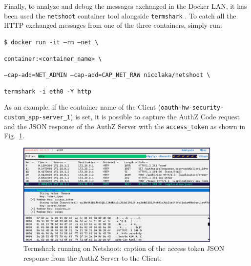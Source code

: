 Finally, to analyze and debug the messages exchanged in the Docker LAN, it has been used the \texttt{netshoot} \cite{netsh} container tool alongside \texttt{termshark} \cite{terms}. To catch all the HTTP exchanged messages from one of the three containers, simply run:

  \texttt{\$ docker run -it --rm --net \textbackslash}
  
  \hspace{0.8cm} \texttt{container:<container\_name> \textbackslash} 
      
  \hspace{0.8cm} \texttt{--cap-add=NET\_ADMIN --cap-add=CAP\_NET\_RAW nicolaka/netshoot \textbackslash}

  \hspace{0.8cm} \texttt{termshark -i eth0 -Y http}

\noindent As an example, if the container name of the Client (\texttt{oauth-hw-security-custom\_app-server\_1}) is set, it is possible to capture the AuthZ Code request and the JSON response of the AuthZ Server with the \texttt{access\_token} as shown in Fig.~\ref{fig:netshoot}.

\begin{figure}
    \centering
    \includegraphics[width=0.9\textwidth]{chapters/images/chp6/netshoot.png}
    \caption{Termshark running on Netshoot: caption of the access token JSON response from the AuthZ Server to the Client.}
    \label{fig:netshoot}
\end{figure}

